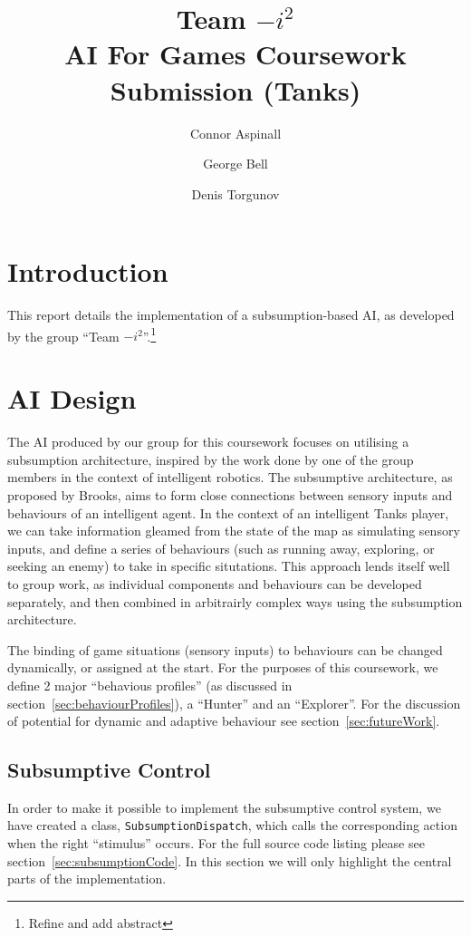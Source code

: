\documentclass[11pt]{article}
\title{Team \(-i^2\)\\
AI For Games Coursework Submission (Tanks)}
\author{Connor Aspinall \and George Bell \and Denis Torgunov}
\date{}
\begin{document}
\maketitle
\tableofcontents
\thispagestyle{empty}

\newpage

\section{Introduction}
This report details the implementation of a subsumption-based AI, as developed by the group ``Team \(-i^2\)''.\footnote{Refine and add abstract}

\section{AI Design}

The AI produced by our group for this coursework focuses on utilising a subsumption architecture, inspired by the work done by one of the group members in the context of intelligent robotics. The subsumptive architecture, as proposed by Brooks, aims to form close connections between sensory inputs and behaviours of an intelligent agent\cite{brooks1}. In the context of an intelligent Tanks player, we can take information gleamed from the state of the map as simulating sensory inputs, and define a series of behaviours (such as running away, exploring, or seeking an enemy) to take in specific situtations. This approach lends itself well to group work, as individual components and behaviours can be developed separately, and then combined in arbitrairly complex ways using the subsumption architecture.

The binding of game situations (sensory inputs) to behaviours can be changed dynamically, or assigned at the start. For the purposes of this coursework, we define 2 major ``behavious profiles'' (as discussed in section~\ref{sec:behaviourProfiles}), a ``Hunter'' and an ``Explorer''. For the discussion of potential for dynamic and adaptive behaviour see section~\ref{sec:futureWork}.
\subsection{Subsumptive Control}

In order to make it possible to implement the subsumptive control system, we have created a class, \verb|SubsumptionDispatch|, which calls the corresponding action when the right ``stimulus'' occurs. For the full source code listing please see section~\ref{sec:subsumptionCode}. In this section we will only highlight the central parts of the implementation.
\end{document}
